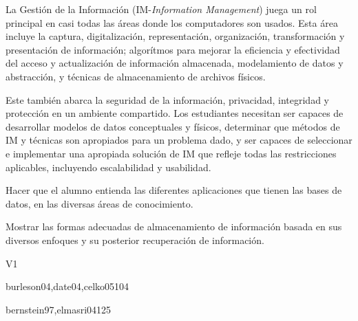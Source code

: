 \begin{syllabus}


\begin{justification}
La Gestión de la Información (IM-\textit{Information Management}) juega un rol principal en casi todas las áreas donde los computadores son usados. Esta área incluye la captura, digitalización, representación, organización, transformación y presentación de información; algorítmos para mejorar la eficiencia y efectividad del acceso y actualización de información almacenada, modelamiento de datos y abstracción, y técnicas de almacenamiento de archivos físicos.

Este también abarca la seguridad de la información, privacidad, integridad y protección en un ambiente compartido. Los estudiantes necesitan ser capaces de desarrollar modelos de datos conceptuales y físicos, determinar que métodos de IM y técnicas son apropiados para un problema dado, y ser capaces de seleccionar e implementar una apropiada solución de IM que refleje todas las restricciones aplicables, incluyendo escalabilidad y usabilidad.
\end{justification}

\begin{goals}
\item Hacer que el alumno entienda las diferentes aplicaciones que tienen las bases de datos, en las diversas áreas de conocimiento.
\item Mostrar las formas adecuadas de almacenamiento de información basada en sus diversos enfoques y su posterior recuperación de información.
\end{goals}

\begin{outcomes}{V1}
\end{outcomes}

\begin{unit}{\IMPhysicalDatabaseDesignDef}{}{burleson04,date04,celko05}{10}{4}
    \IMPhysicalDatabaseDesignAllTopics%
    \IMPhysicalDatabaseDesignAllObjectives%
\end{unit}

\begin{unit}{\IMTransactionProcessingDef}{}{bernstein97,elmasri04}{12}{5}
    \IMTransactionProcessingAllTopics
    \IMTransactionProcessingAllObjectives
\end{unit}


\end{syllabus}
